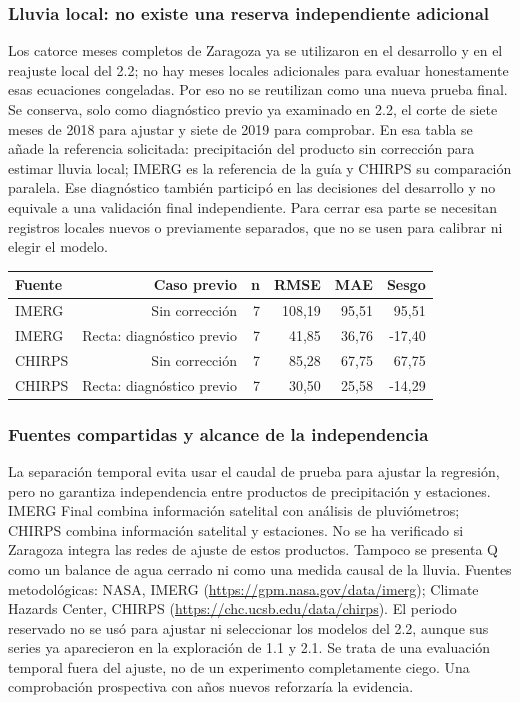 \subsubsection*{Lluvia local: no existe una reserva independiente adicional}
Los catorce meses completos de Zaragoza ya se utilizaron en el desarrollo y en el reajuste local del 2.2; no hay meses locales adicionales para evaluar honestamente esas ecuaciones congeladas. Por eso no se reutilizan como una nueva prueba final. Se conserva, solo como diagnóstico previo ya examinado en 2.2, el corte de siete meses de 2018 para ajustar y siete de 2019 para comprobar. En esa tabla se añade la referencia solicitada: precipitación del producto sin corrección para estimar lluvia local; IMERG es la referencia de la guía y CHIRPS su comparación paralela. Ese diagnóstico también participó en las decisiones del desarrollo y no equivale a una validación final independiente. Para cerrar esa parte se necesitan registros locales nuevos o previamente separados, que no se usen para calibrar ni elegir el modelo.
\begin{center}\small\begin{tabular}{lrrrrr}\hline
Fuente & Caso previo & n & RMSE & MAE & Sesgo \\ \hline
IMERG & Sin corrección & 7 & 108,19 & 95,51 & 95,51 \\
IMERG & Recta: diagnóstico previo & 7 & 41,85 & 36,76 & -17,40 \\
CHIRPS & Sin corrección & 7 & 85,28 & 67,75 & 67,75 \\
CHIRPS & Recta: diagnóstico previo & 7 & 30,50 & 25,58 & -14,29 \\
\hline\end{tabular}\end{center}
\subsubsection*{Fuentes compartidas y alcance de la independencia}
La separación temporal evita usar el caudal de prueba para ajustar la regresión, pero no garantiza independencia entre productos de precipitación y estaciones. IMERG Final combina información satelital con análisis de pluviómetros; CHIRPS combina información satelital y estaciones. No se ha verificado si Zaragoza integra las redes de ajuste de estos productos. Tampoco se presenta Q como un balance de agua cerrado ni como una medida causal de la lluvia. Fuentes metodológicas: NASA, IMERG (\url{https://gpm.nasa.gov/data/imerg}); Climate Hazards Center, CHIRPS (\url{https://chc.ucsb.edu/data/chirps}). El periodo reservado no se usó para ajustar ni seleccionar los modelos del 2.2, aunque sus series ya aparecieron en la exploración de 1.1 y 2.1. Se trata de una evaluación temporal fuera del ajuste, no de un experimento completamente ciego. Una comprobación prospectiva con años nuevos reforzaría la evidencia.
